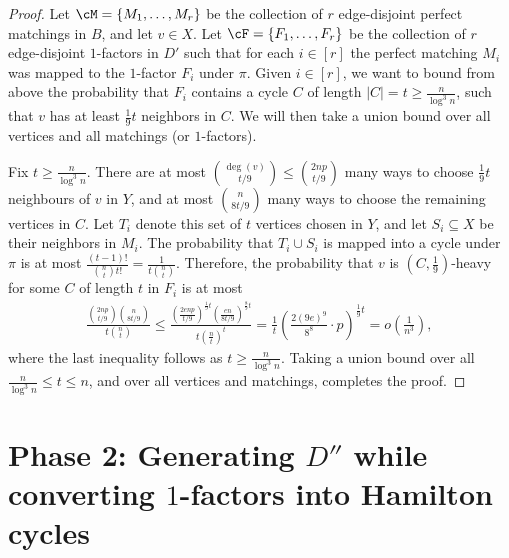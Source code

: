\documentclass{article}
\begin{document}
    \begin{proof}
		Let $\cM = \{M_1,\ldots,M_r\}$ be the collection of $r$ edge-disjoint perfect matchings in $B$, and let $v \in X$.
        Let $\cF = \{F_1, \ldots, F_r \}$ be the collection of $r$ edge-disjoint $1$-factors in $D'$ such that for each $i \in [r]$ the perfect matching $M_i$ was mapped to the $1$-factor $F_i$ under $\pi$.
        Given $i\in [r]$, we want to bound from above the probability that $F_i$ contains a cycle $C$ of length $|C|=t\ge \frac{n}{\log^3 n}$, such that $v$ has at least $\frac{1}{9}t$ neighbors in $C$.
        We will then take a union bound over all vertices and all matchings (or $1$-factors).

        Fix $t\ge \frac{n}{\log^3 n}$.
        There are at most $\binom{\deg(v)}{t/9} \le \binom{2np}{t/9}$ many ways to choose $\frac{1}{9}t$ neighbours of $v$ in $Y$, and at most $\binom{n}{8t/9}$ many ways to choose the remaining vertices in $C$.
        Let $T_i$ denote this set of $t$ vertices chosen in $Y$, and let $S_i \subseteq X$ be their neighbors in $M_i$.
        The probability that $T_i\cup S_i$ is mapped into a cycle under $\pi$ is at most $\frac{(t-1)!}{\binom{n}{t}t!}=\frac{1}{t\binom{n}{t}}$. Therefore, the probability that $v$ is $(C,\frac 19)$-heavy for some $C$ of length $t$ in $F_i$ is at most
        \begin{align*}
        	\frac{\binom{2np}{t/9} \binom{n}{8t/9}}{t\binom{n}{t}} \le \frac{\left(\frac{2enp}{t/9} \right)^{\frac{1}{9}t} \left(\frac{en}{8t/9} \right)^{\frac{8}{9}t}}{t \left(\frac{n}{t} \right)^t} = \frac{1}{t} \left(\frac{2(9e)^9}{8^8} \cdot p \right)^{\frac{1}{9}t} = o\left(\frac{1}{n^3} \right),
        \end{align*}
        where the last inequality follows as $t \ge \frac{n}{\log^3 n}$.
        Taking a union bound over all $\frac{n}{\log^3 n} \le t \le n$, and over all vertices and matchings, completes the proof.
	\end{proof}

	
	\section{\texorpdfstring{Phase 2: Generating $D''$ while converting $1$-factors into Hamilton cycles}{Phase 2: Generating D'' while converting 1-factors into Hamilton cycles}}
	
\end{document}
